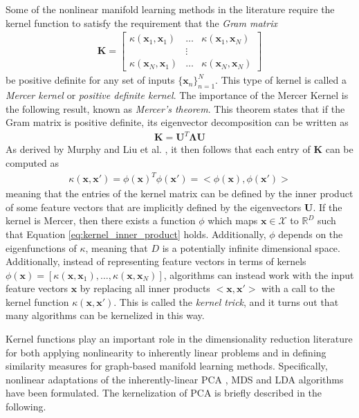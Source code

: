 Some of the nonlinear manifold learning methods in the literature require the kernel function to satisfy the requirement that the \textit{Gram matrix}
\begin{align}
	\bm{K} = 	
	\begin{bmatrix}
		\kappa(\bm{x}_{1},\bm{x}_{1}) &  \dots & \kappa(\bm{x}_{1},\bm{x}_{N}) \\
		 & \vdots  & \\
		\kappa(\bm{x}_{N},\bm{x}_{1}) & \dots & \kappa(\bm{x}_{N},\bm{x}_{N})
	\end{bmatrix}
\end{align}
\noindent
be positive definite for any set of inputs $\{\bm{x}_{n}\}_{n=1}^{N}$.  This type of kernel is called a \textit{Mercer kernel} or \textit{positive definite kernel}.  The importance of the Mercer Kernel is the following result, known as \textit{Mercer's theorem}.  This theorem states that if the Gram matrix is positive definite, its eigenvector decomposition can be written as
\begin{align}
	\bm{K} = \bm{U}^{T}\bm{\Lambda}\bm{U}
\end{align}
As derived by Murphy and Liu et al. \citep{Murphy2012,Liu2010KernelAdaptiveFiltering}, it then follows that each entry of $\bm{K}$ can be computed as 
\begin{align}
	\kappa(\bm{x},\bm{x}') = \phi(\bm{x})^{T}\phi(\bm{x}') = <\phi(\bm{x}),\phi(\bm{x}')>
	\label{eq:kernel_inner_product}
\end{align}
meaning that the entries of the kernel matrix can be defined by the inner product of some feature vectors that are implicitly defined by the eigenvectors $\bm{U}$.  If the kernel is Mercer, then there exists a function $\phi$ which maps $\bm{x} \in \mathcal{X}$ to $\mathbb{R}^{D}$ such that Equation \ref{eq:kernel_inner_product} holds.  Additionally, $\phi$ depends on the eigenfunctions of $\kappa$, meaning that $D$ is a potentially infinite dimensional space.
Additionally, instead of representing feature vectors in terms of kernels $\phi(\bm{x}) = [\kappa(\bm{x},\bm{x}_{1}), \dots, \kappa(\bm{x},\bm{x}_{N})]$, algorithms can instead work with the input feature vectors $\bm{x}$ by replacing all inner products $<\bm{x},\bm{x}'>$ with a call to the kernel function $\kappa(\bm{x},\bm{x}')$.  This is called the \textit{kernel trick}, and it turns out that many algorithms can be kernelized in this way.

Kernel functions play an important role in the dimensionality reduction literature for both applying nonlinearity to inherently linear problems and in defining similarity measures for graph-based manifold learning methods.  Specifically, nonlinear adaptations of the inherently-linear PCA \citep{Scholkopf1999KPCA}, MDS \citep{Webb2002KMDS} and LDA \citep{Ghojogh2019KDATutorial} algorithms have been formulated. The kernelization of PCA is briefly described in the following. 

